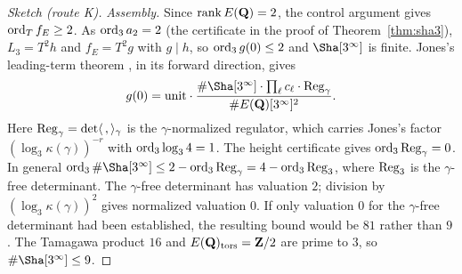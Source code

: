 \begin{proof}[Sketch (route K)]
\emph{Assembly.} Since $\operatorname{rank} E(\mathbf{Q})=2$, the control argument gives $\operatorname{ord}_Tf_E\ge2$. As $\operatorname{ord}_3a_2=2$ (the certificate in the proof of Theorem~\ref{thm:sha3}), $L_3=T^2h$ and $f_E=T^2g$ with $g\mid h$, so $\operatorname{ord}_3g(0)\le2$ and $\Sha[3^\infty]$ is finite. Jones's leading-term theorem \cite[Thm.~3.1]{jones}, in its forward direction, gives
\[
g(0)=\text{unit}\cdot\frac{\#\Sha[3^\infty]\cdot\prod_\ell c_\ell\cdot\Reg_\gamma}{\#E(\Q)[3^\infty]^2}.
\]
Here $\operatorname{Reg}_\gamma=\det\langle\,,\rangle_\gamma$ is the $\gamma$-normalized regulator, which carries Jones's factor $(\log_3\kappa(\gamma))^{-r}$ with $\operatorname{ord}_3\log_34=1$. The height certificate gives $\operatorname{ord}_3\operatorname{Reg}_\gamma=0$. In general $\ord_3\#\Sha[3^\infty]\le2-\ord_3\Reg_\gamma=4-\ord_3\Reg_3$, where $\operatorname{Reg}_3$ is the $\gamma$-free determinant. The $\gamma$-free determinant has valuation $2$; division by $(\log_3\kappa(\gamma))^2$ gives normalized valuation $0$. If only valuation $0$ for the $\gamma$-free determinant had been established, the resulting bound would be $81$ rather than $9$. The Tamagawa product $16$ and $E(\mathbf{Q})_{\mathrm{tors}}=\mathbf{Z}/2$ are prime to $3$, so $\#\Sha[3^\infty]\le9$.
\end{proof}

